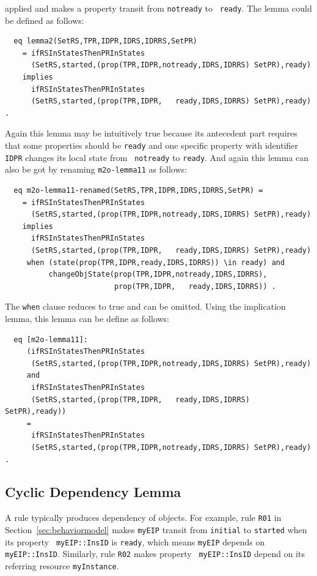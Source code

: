 \documentclass[12pt]{report}
\begin{document}
applied and makes a property transit from {\tt notready} to {\tt
  ready}.  The lemma could be defined as follows:
\begin{verbatim}
  eq lemma2(SetRS,TPR,IDPR,IDRS,IDRRS,SetPR)
    = ifRSInStatesThenPRInStates
      (SetRS,started,(prop(TPR,IDPR,notready,IDRS,IDRRS) SetPR),ready)
    implies
      ifRSInStatesThenPRInStates
      (SetRS,started,(prop(TPR,IDPR,   ready,IDRS,IDRRS) SetPR),ready) .
\end{verbatim}
Again this lemma may be intuitively true because its antecedent part
requires that some properties should be {\tt ready} and one specific
property with identifier {\tt IDPR} changes its local state from {\tt
  notready} to {\tt ready}. And again this lemma can also be got by
renaming {\tt m2o-lemma11} as follows:
\begin{verbatim}
  eq m2o-lemma11-renamed(SetRS,TPR,IDPR,IDRS,IDRRS,SetPR) =
    = ifRSInStatesThenPRInStates
      (SetRS,started,(prop(TPR,IDPR,notready,IDRS,IDRRS) SetPR),ready)
    implies
      ifRSInStatesThenPRInStates
      (SetRS,started,(prop(TPR,IDPR,   ready,IDRS,IDRRS) SetPR),ready)
     when (state(prop(TPR,IDPR,ready,IDRS,IDRRS)) \in ready) and 
          changeObjState(prop(TPR,IDPR,notready,IDRS,IDRRS),
                         prop(TPR,IDPR,   ready,IDRS,IDRRS)) .
\end{verbatim}
The {\tt when} clause reduces to true and can be omitted. Using the
implication lemma, this lemma can be define as follows:
\begin{verbatim}
  eq [m2o-lemma11]:
     (ifRSInStatesThenPRInStates
      (SetRS,started,(prop(TPR,IDPR,notready,IDRS,IDRRS) SetPR),ready)
     and
      ifRSInStatesThenPRInStates
      (SetRS,started,(prop(TPR,IDPR,   ready,IDRS,IDRRS) SetPR),ready))
     = 
      ifRSInStatesThenPRInStates
      (SetRS,started,(prop(TPR,IDPR,notready,IDRS,IDRRS) SetPR),ready) .
\end{verbatim}

\subsection{Cyclic Dependency Lemma}
\label{sec:cyclelemma}
A rule typically produces dependency of objects.  For example, rule
{\tt R01} in Section~\ref{sec:behaviormodel} makes {\tt myEIP} transit
from {\tt initial} to {\tt started} when its property {\tt
  myEIP::InsID} is {\tt ready}, which means {\tt myEIP} depends on
{\tt myEIP::InsID}.  Similarly, rule {\tt R02} makes property {\tt
  myEIP::InsID} depend on its referring resource {\tt myInstance}.
\end{document}
